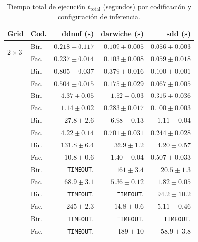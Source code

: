 \begin{table}[htbp]
    \centering
    \caption{Tiempo total de ejecución $t_{\text{total}}$ (segundos) por codificación y configuración de inferencia.}
    \label{tab:exp-tiempos}
    \footnotesize
    \begin{tabular}{l l r r r}
        \toprule
        \textbf{Grid} & \textbf{Cod.} &
            \textbf{ddnnf} (s) &
            \textbf{darwiche} (s) &
            \textbf{sdd} (s) \\
        \midrule
        \multirow{2}{*}{$2 \times 3$}
            & Bin. & $0.218 \pm 0.117$ & $0.109 \pm 0.005$ & $0.056 \pm 0.003$ \\
            & Fac. & $0.237 \pm 0.014$ & $0.103 \pm 0.008$ & $0.059 \pm 0.018$ \\
        \addlinespace
        \multirow{2}{*}{$3 \times 3$}
            & Bin. & $0.805 \pm 0.037$ & $0.379 \pm 0.016$ & $0.100 \pm 0.001$ \\
            & Fac. & $0.504 \pm 0.015$ & $0.175 \pm 0.029$ & $0.067 \pm 0.005$ \\
        \addlinespace
        \multirow{2}{*}{$4 \times 4$}
            & Bin. & $4.37 \pm 0.05$   & $1.52 \pm 0.03$   & $0.315 \pm 0.036$ \\
            & Fac. & $1.14 \pm 0.02$   & $0.283 \pm 0.017$ & $0.100 \pm 0.003$ \\
        \addlinespace
        \multirow{2}{*}{$6 \times 6$}
            & Bin. & $27.8 \pm 2.6$    & $6.98 \pm 0.13$   & $1.11 \pm 0.04$   \\
            & Fac. & $4.22 \pm 0.14$   & $0.701 \pm 0.031$ & $0.244 \pm 0.028$ \\
        \addlinespace
        \multirow{2}{*}{$8 \times 8$}
            & Bin. & $131.8 \pm 6.4$   & $32.9 \pm 1.2$    & $4.20 \pm 0.57$   \\
            & Fac. & $10.8 \pm 0.6$    & $1.40 \pm 0.04$   & $0.507 \pm 0.033$ \\
        \addlinespace
        \multirow{2}{*}{$12 \times 12$}
            & Bin. & \texttt{TIMEOUT}.              & $161 \pm 3.4$     & $20.5 \pm 1.3$    \\
            & Fac. & $68.9 \pm 3.1$    & $5.36 \pm 0.12$   & $1.82 \pm 0.05$   \\
        \addlinespace
        \multirow{2}{*}{$16 \times 16$}
            & Bin. & \texttt{TIMEOUT}.              & \texttt{TIMEOUT}.              & $94.2 \pm 10.2$   \\
            & Fac. & $245 \pm 2.3$     & $14.8 \pm 0.6$    & $5.11 \pm 0.46$   \\
        \addlinespace
        \multirow{2}{*}{$32 \times 32$}
            & Bin. & \texttt{TIMEOUT}.              & \texttt{TIMEOUT}.              & \texttt{TIMEOUT}.              \\
            & Fac. & \texttt{TIMEOUT}.              & $189 \pm 10$      & $58.9 \pm 3.8$    \\
        \bottomrule
    \end{tabular}
\end{table}

